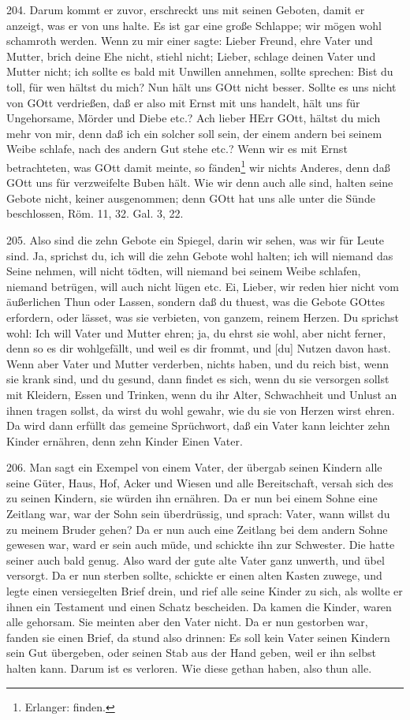 204. Darum kommt er zuvor, erschreckt uns mit seinen Geboten, damit er anzeigt, was er von uns halte. Es ist gar eine große Schlappe; wir mögen wohl schamroth werden. Wenn zu mir einer sagte: Lieber Freund, ehre Vater und Mutter, brich deine Ehe nicht, stiehl nicht; Lieber, schlage deinen Vater und Mutter nicht; ich sollte es bald mit Unwillen annehmen, sollte sprechen: Bist du toll, für wen hältst du mich? Nun hält uns GOtt nicht besser. Sollte es uns nicht von GOtt verdrießen, daß er also mit Ernst mit uns handelt, hält uns für Ungehorsame, Mörder und Diebe etc.? Ach lieber HErr GOtt, hältst du mich mehr von mir, denn daß ich ein solcher soll sein, der einem andern bei seinem Weibe schlafe, nach des andern Gut stehe etc.? Wenn wir es mit Ernst betrachteten, was GOtt damit meinte, so fänden\footnote{Erlanger: finden.} wir nichts Anderes, denn daß GOtt uns für verzweifelte Buben hält. Wie wir denn auch alle sind, halten seine Gebote nicht, keiner ausgenommen; denn GOtt hat uns alle unter die Sünde beschlossen, Röm. 11, 32. Gal. 3, 22.

205. Also sind die zehn Gebote ein Spiegel, darin wir sehen, was wir für Leute sind. Ja, sprichst du, ich will die zehn Gebote wohl halten; ich will niemand das Seine nehmen, will nicht tödten, will niemand bei seinem Weibe schlafen, niemand betrügen, will auch nicht lügen etc. Ei, Lieber, wir reden hier nicht vom äußerlichen Thun oder Lassen, sondern daß du thuest, was
die Gebote GOttes erfordern, oder lässet, was sie verbieten, von ganzem, reinem Herzen. Du sprichst wohl: Ich will Vater und Mutter ehren; ja, du ehrst sie wohl, aber nicht ferner, denn so es dir wohlgefällt, und weil es dir frommt, und [du] Nutzen davon hast. Wenn aber Vater und Mutter verderben, nichts haben, und du reich bist, wenn sie krank sind, und du gesund, dann findet es sich, wenn du sie versorgen sollst mit Kleidern, Essen und Trinken, wenn du ihr Alter, Schwachheit und Unlust an ihnen tragen sollst, da wirst du wohl gewahr, wie du sie von Herzen wirst ehren. Da wird dann erfüllt das gemeine Sprüchwort, daß ein Vater kann leichter zehn Kinder ernähren, denn zehn Kinder Einen Vater.

206. Man sagt ein Exempel von einem Vater, der übergab seinen Kindern alle seine Güter, Haus, Hof, Acker und Wiesen und alle Bereitschaft, versah sich des zu seinen Kindern, sie würden ihn ernähren. Da er nun bei einem Sohne eine Zeitlang war, war der Sohn sein überdrüssig, und sprach: Vater, wann willst du zu meinem Bruder gehen? Da er nun auch eine Zeitlang bei dem andern Sohne gewesen war, ward er sein auch müde, und schickte ihn zur Schwester. Die hatte seiner auch bald genug. Also ward der gute alte Vater ganz unwerth, und übel versorgt. Da er nun sterben sollte, schickte er einen alten Kasten zuwege, und legte einen versiegelten Brief drein, und rief alle seine Kinder zu sich, als wollte er ihnen ein Testament und einen Schatz bescheiden. Da kamen die Kinder, waren alle gehorsam. Sie meinten aber den Vater nicht. Da er nun gestorben war, fanden sie einen Brief, da stund also drinnen: Es soll kein Vater seinen Kindern sein Gut übergeben, oder seinen Stab aus der Hand geben, weil er ihn selbst halten kann. Darum ist es verloren. Wie diese gethan haben, also thun alle.

